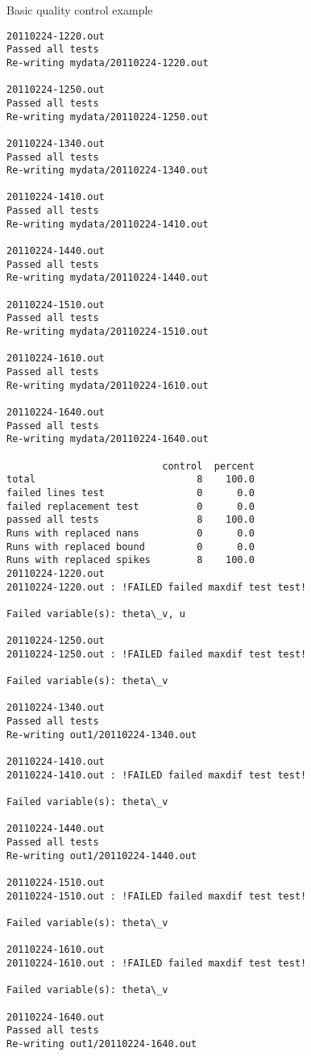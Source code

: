 \documentclass[11pt]{article}
\begin{document}
\begin{block}{Basic quality control example}
    \begin{Verbatim}[commandchars=\\\{\}]
20110224-1220.out
Passed all tests
Re-writing mydata/20110224-1220.out

20110224-1250.out
Passed all tests
Re-writing mydata/20110224-1250.out

20110224-1340.out
Passed all tests
Re-writing mydata/20110224-1340.out

20110224-1410.out
Passed all tests
Re-writing mydata/20110224-1410.out

20110224-1440.out
Passed all tests
Re-writing mydata/20110224-1440.out

20110224-1510.out
Passed all tests
Re-writing mydata/20110224-1510.out

20110224-1610.out
Passed all tests
Re-writing mydata/20110224-1610.out

20110224-1640.out
Passed all tests
Re-writing mydata/20110224-1640.out

                           control  percent
total                            8    100.0
failed lines test                0      0.0
failed replacement test          0      0.0
passed all tests                 8    100.0
Runs with replaced nans          0      0.0
Runs with replaced bound         0      0.0
Runs with replaced spikes        8    100.0
20110224-1220.out
20110224-1220.out : !FAILED failed maxdif test test!

Failed variable(s): theta\_v, u 

20110224-1250.out
20110224-1250.out : !FAILED failed maxdif test test!

Failed variable(s): theta\_v 

20110224-1340.out
Passed all tests
Re-writing out1/20110224-1340.out

20110224-1410.out
20110224-1410.out : !FAILED failed maxdif test test!

Failed variable(s): theta\_v 

20110224-1440.out
Passed all tests
Re-writing out1/20110224-1440.out

20110224-1510.out
20110224-1510.out : !FAILED failed maxdif test test!

Failed variable(s): theta\_v 

20110224-1610.out
20110224-1610.out : !FAILED failed maxdif test test!

Failed variable(s): theta\_v 

20110224-1640.out
Passed all tests
Re-writing out1/20110224-1640.out


\end{Verbatim}
\end{block}
\end{document}
